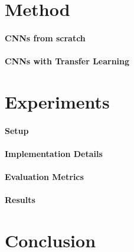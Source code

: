 \documentclass{article}
\begin{document}
\section{Method}

\paragraph{CNNs from scratch}

\paragraph{CNNs with Transfer Learning}


\section{Experiments}

\paragraph{Setup}

\paragraph{Implementation Details}

\paragraph{Evaluation Metrics}

\paragraph{Results}




\section{Conclusion}
\end{document}
